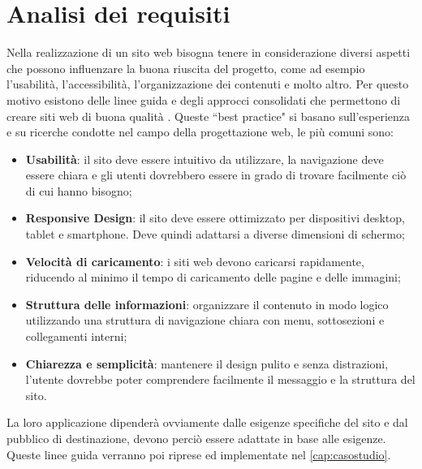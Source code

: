 \documentclass[target=bach,aauheader=]{thud}
\begin{document}
\section{Analisi dei requisiti}
Nella realizzazione di un sito web bisogna tenere in considerazione diversi aspetti che possono influenzare la buona riuscita del progetto, come ad esempio l'usabilità, l'accessibilità, l'organizzazione dei contenuti e molto altro.
Per questo motivo esistono delle linee guida e degli approcci consolidati che permettono di creare siti web di buona qualità \cite{hong2006influence}. Queste ``best practice" si basano sull'esperienza e su ricerche condotte nel campo della progettazione web, le più comuni sono:
\begin{itemize}
    \item \textbf{Usabilità}: il sito deve essere intuitivo da utilizzare, la navigazione deve essere chiara e gli utenti dovrebbero essere in grado di trovare facilmente ciò di cui hanno bisogno;
    \item \textbf{Responsive Design}: il sito deve essere ottimizzato per dispositivi desktop, tablet e smartphone. Deve quindi adattarsi a diverse dimensioni di schermo;
    \item \textbf{Velocità di caricamento}: i siti web devono caricarsi rapidamente, riducendo al minimo il tempo di caricamento delle pagine e delle immagini;
    \item \textbf{Struttura delle informazioni}: organizzare il contenuto in modo logico utilizzando una struttura di navigazione chiara con menu, sottosezioni e collegamenti interni;
    \item \textbf{Chiarezza e semplicità}: mantenere il design pulito e senza distrazioni, l'utente dovrebbe poter comprendere facilmente il messaggio e la struttura del sito.
\end{itemize}
La loro applicazione dipenderà ovviamente dalle esigenze specifiche del sito e dal pubblico di destinazione, devono perciò essere adattate in base alle esigenze.
\newline Queste linee guida verranno poi riprese ed implementate nel \cref{cap:casostudio}.

\end{document}
